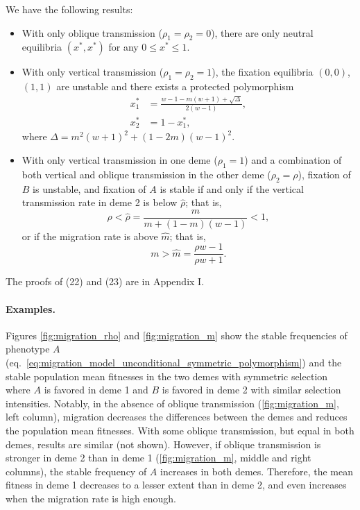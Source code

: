 \documentclass[14pt]{extarticle}
\begin{document}
We have the following results:
\begin{itemize}
\item With only oblique transmission ($\rho_1=\rho_2=0$), there are only neutral equilibria $(x^*,x^*)$ for any $0 \le x^* \le 1$.
\item With only vertical transmission ($\rho_1=\rho_2=1$), the fixation equilibria  $(0,0)$, $(1,1)$ are unstable and there exists a protected polymorphism
\begin{equation}
\begin{aligned} \label{eq:migration_model_unconditional_symmetric_polymorphism}
x_1^* &= \frac{w-1-m(w+1) + \sqrt{\Delta}}{2(w-1)}, \\
x_2^* &= 1-x_1^*,
\end{aligned}
\end{equation}
where $\Delta = m^2(w+1)^2+(1-2m)(w-1)^2$.
\item With only vertical transmission in one deme ($\rho_1=1$) and a combination of both vertical and oblique transmission in the other deme ($\rho_2=\rho$), fixation of $B$ is unstable, and fixation of $A$ is stable if and only if the vertical transmission rate in deme 2 is below $\hat \rho$; that is,
\begin{equation} \label{eq:migration_model_unconditional_symmetric_condition_rho}
\rho < \hat \rho = \frac{m}{m+(1-m)(w-1)} < 1,
\end{equation}
or if the migration rate is above $\hat m$; that is,
\begin{equation} \label{eq:migration_model_unconditional_symmetric_condition_m}
m > \hat m = \frac{\rho w - 1}{\rho w + 1}.
\end{equation}
\end{itemize}
{\color{red}The proofs of (22) and (23) are in Appendix I.}
\paragraph{Examples.}

Figures \ref{fig:migration_rho} and \ref{fig:migration_m} show the stable frequencies of phenotype $A$~ (eq.~\ref{eq:migration_model_unconditional_symmetric_polymorphism}) and the stable population mean fitnesses in the two demes with symmetric selection where $A$ is favored in deme 1 and $B$ is favored in deme 2 with similar selection intensities.
Notably, in the absence of oblique transmission (\autoref{fig:migration_m}, left column), migration decreases the differences between the demes and reduces the population mean fitnesses.
With some oblique transmission, but equal in both demes, results are similar (not shown).
However, if oblique transmission is stronger in deme 2 than in deme 1 (\autoref{fig:migration_m}, middle and right columns), the stable frequency of $A$ increases in both demes.
Therefore, the mean fitness in deme 1 decreases to a lesser extent than in deme 2, and even increases when the migration rate is high enough.
\end{document}
